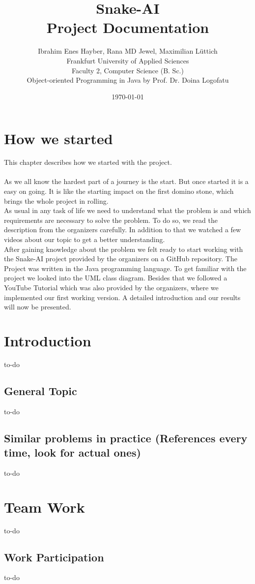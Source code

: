 \documentclass[a4paper,12pt]{article}
\title{Snake-AI\\Project Documentation}
\author{Ibrahim Enes Hayber, Rana MD Jewel, Maximilian Lüttich\\
		Frankfurt University of Applied Sciences\\
		Faculty 2, Computer Science (B. Sc.)\\
		Object-oriented Programming in Java by Prof. Dr. Doina Logofatu
}
\date{\today}
\begin{document}
\maketitle
\newpage
\tableofcontents
\newpage
\section{How we started}
This chapter describes how we started with the project.\\
\\As we all know the hardest part of a journey is the start. But once started it is a easy on going.
It is like the starting impact on the first domino stone, which brings the whole project in rolling.
\\As usual in any task of life we need to understand what the problem is and which requirements are necessary to solve the problem. To do so, we read the description from the organizers carefully. In addition to that we watched a few videos about our topic to get a better understanding.\\
After gaining knowledge about the problem we felt ready to start working with the Snake-AI project provided by the organizers on a GitHub repository. The Project was written in the Java programming language. To get familiar with the project we looked into the UML class
diagram. Besides that we followed a YouTube Tutorial which was also provided by the organizers, where we implemented our first working version. A detailed introduction and our results will now be presented.
\newpage

\section{Introduction}
to-do
\subsection{General Topic}
to-do
\subsection{Similar problems in practice (References every time, look for actual ones)}
to-do

\section{Team Work}
to-do
\subsection{Work Participation}
to-do
\end{document}
